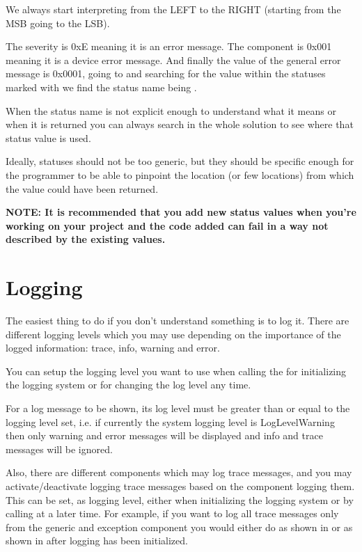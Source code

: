 \begin{appendices}
\begin{itemize}
	We always start interpreting from the LEFT to the RIGHT (starting from the MSB going to the LSB).

	The severity is 0xE meaning it is an error message.
	The component is 0x001 meaning it is a device error message.
	And finally the value of the general error message is 0x0001, going to  and
searching for the value within the statuses marked with  we find the status
name being .
\end{itemize}

When the status name is not explicit enough to understand what it means or when it is returned you
can always search in the whole solution to see where that status value is used.

Ideally, statuses should not be too generic, but they should be specific enough for the programmer
to be able to pinpoint the location (or few locations) from which the value could have been returned.

\textbf{NOTE: It is recommended that you add new status values when you're working on your project
and the code added can fail in a way not described by the existing values.}

\section{Logging}

The easiest thing to do if you don't understand something is to log it. There are different logging
levels which you may use depending on the importance of the logged information: trace, info, warning
and error.

You can setup the logging level you want to use when calling the  for
initializing the logging system or  for changing the log level any time.

For a log message to be shown, its log level must be greater than or equal to the logging level set,
 i.e. if currently the system logging level is LogLevelWarning then only warning and error messages
will be displayed and info and trace messages will be ignored.

Also, there are different components which may log trace messages, and you may activate/deactivate
logging trace messages based on the component logging them. This can be set, as logging level, 
either when initializing the logging system or by calling  at a later
time. For example, if you want to log all trace messages only from the generic and exception
component you would either do as shown in  or as shown in
 after logging has been initialized.


\end{appendices}
